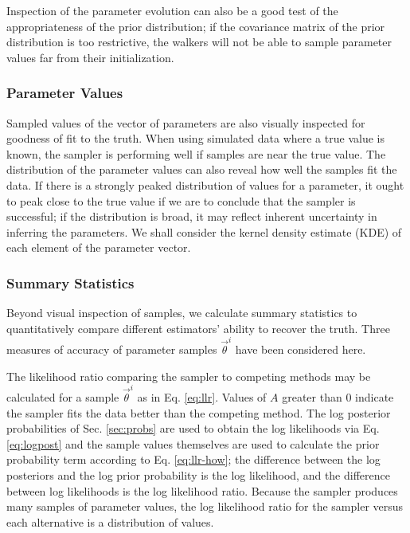 \documentclass[preprint]{aastex}
\begin{document}
Inspection of the parameter evolution can also be a good test of the 
appropriateness of the prior distribution; if the covariance matrix of the 
prior distribution is too restrictive, the walkers will not be able to sample 
parameter values far from their initialization.  

\clearpage
\subsubsection{Parameter Values}
\label{sec:samps}

Sampled values of the vector of parameters are also visually inspected for 
goodness of fit to the truth.  When using simulated data where a true value is 
known, the sampler is performing well if samples are near the true value.  The 
distribution of the parameter values can also reveal how well the samples fit 
the data.  If there is a strongly peaked distribution of values for a 
parameter, it ought to peak close to the true value if we are to conclude that 
the sampler is successful; if the distribution is broad, it may reflect 
inherent uncertainty in inferring the parameters.  We shall consider the kernel 
density estimate (KDE) of each element of the parameter vector.

\clearpage
\subsubsection{Summary Statistics}
\label{sec:stats}

Beyond visual inspection of samples, we calculate summary statistics to 
quantitatively compare different estimators' ability to recover the truth.  
Three measures of accuracy of parameter samples $\vec{\theta}^{i}$  have been 
considered here.  

The likelihood ratio comparing the sampler to competing methods may be 
calculated for a sample $\vec{\theta}^{i}$ as in Eq. \ref{eq:llr}.  Values of 
$A$ greater than 0 indicate the sampler fits the data better than the competing 
method.  The log posterior probabilities of Sec. \ref{sec:probs} are used to 
obtain the log likelihoods via Eq. \ref{eq:logpost} and the sample values 
themselves are used to calculate the prior probability term according to Eq. 
\ref{eq:llr-how}; the difference between the log posteriors and the log prior 
probability is the log likelihood, and the difference between log likelihoods 
is the log likelihood ratio.  Because the sampler produces many samples of 
parameter values, the log likelihood ratio for the sampler versus each 
alternative is a distribution of values.
\end{document}
